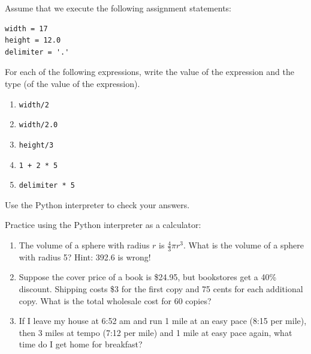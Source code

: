 \documentclass[10pt]{book}
\begin{document}
\begin{ex}
Assume that we execute the following assignment statements:

\begin{verbatim}
width = 17
height = 12.0
delimiter = '.'
\end{verbatim}

For each of the following expressions, write the value of the
expression and the type (of the value of the expression).

\begin{enumerate}

\item {\tt width/2}

\item {\tt width/2.0}

\item {\tt height/3}

\item {\tt 1 + 2 * 5}

\item {\tt delimiter * 5}

\end{enumerate}

Use the Python interpreter to check your answers.
\end{ex}

\begin{ex}
Practice using the Python interpreter as a calculator: 

\begin{enumerate}

\item The volume of a sphere with radius $r$ is $\frac{4}{3} \pi r^3$.
  What is the volume of a sphere with radius 5?  Hint: 392.6 is wrong!

\item Suppose the cover price of a book is \$24.95, but bookstores get a
  40\% discount.  Shipping costs \$3 for the first copy and 75 cents
  for each additional copy.  What is the total wholesale cost for
  60 copies?

\item If I leave my house at 6:52 am and run 1 mile at an easy pace
  (8:15 per mile), then 3 miles at tempo (7:12 per mile) and 1 mile at
  easy pace again, what time do I get home for breakfast?


\end{enumerate}
\end{ex}
\end{document}

